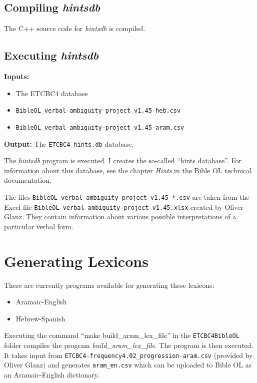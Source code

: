 \documentclass[11pt,oneside,a4paper,article]{memoir}
\begin{document}
\section{Compiling \emph{hintsdb}}

The C++ source code for \emph{hintsdb} is compiled.


\section{Executing \emph{hintsdb}}

\noindent \textbf{Inputs:}
\begin{itemize}
\item The ETCBC4 database
\item \texttt{BibleOL\_verbal-ambiguity-project\_v1.45-heb.csv}
\item \texttt{BibleOL\_verbal-ambiguity-project\_v1.45-aram.csv}
\end{itemize}

\noindent \textbf{Output:} The \texttt{ETCBC4\_hints.db} database.

\vspace{1ex}

The \emph{hintsdb} program is executed. I creates the so-called ``hints database''. For information
about this database, see the chapter \emph{Hints} in the Bible OL technical documentation.

The files \texttt{BibleOL\_verbal-ambiguity-project\_v1.45-*.csv} are taken from the Excel file
\texttt{BibleOL\_verbal-ambiguity-project\_v1.45.xlsx} created by Oliver Glanz. They contain information
about various possible interpretations of a particular verbal form.



\chapter{Generating Lexicons}

There are currently programs available for generating these lexicons:
\begin{itemize}
\item Aramaic-English
\item Hebrew-Spanish
\end{itemize}

Executing the command ``make build\_aram\_lex\_file'' in the \texttt{ETCBC4BibleOL} folder compiles the
program \emph{build\_aram\_lex\_file}. The program is then executed. It takes input from
\texttt{ETCBC4-frequency4.02\_progression-aram.csv} (provided by Oliver Glanz) and generates
\texttt{aram\_en.csv} which can be uploaded to Bible OL as an Aramaic-English dictionary.
\end{document}
